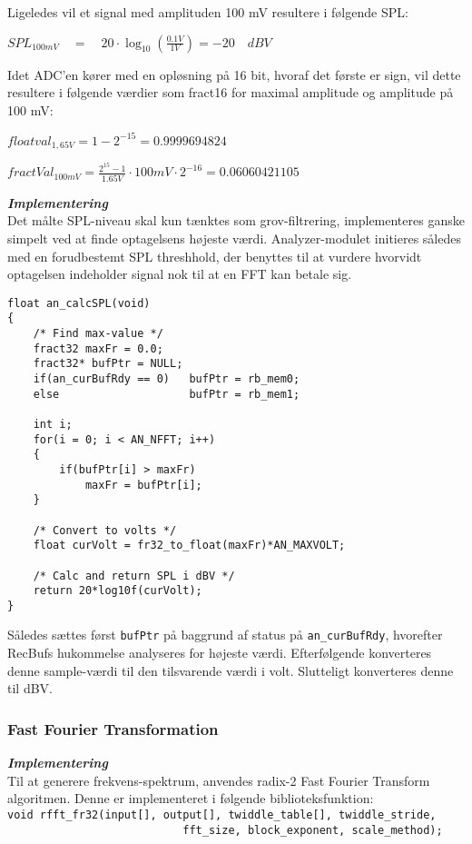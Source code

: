 Ligeledes vil et signal med amplituden 100 mV resultere i følgende SPL:
\begin{center}
${ SPL }_{ 100mV }\quad =\quad 20\cdot \log _{ 10 }{ \left( \frac { 0.1V }{ 1V }  \right)  } =-20\quad dBV$
\end{center}

Idet ADC'en kører med en opløsning på 16 bit, hvoraf det første er sign, vil dette resultere i følgende værdier som fract16 for maximal amplitude og amplitude på 100 mV:
\begin{center}
${ floatval }_{ 1,65V }=1-{ 2 }^{ -15 }=0.9999694824$ 
\end{center}
\begin{center}
$fractVal_{ 100mV }=\frac { { 2 }^{ 15 }-1 }{ 1.65V } \cdot 100mV\cdot { 2 }^{ -16 }=0.06060421105$
\end{center}

\textbf{\textit{Implementering}} \\
Det målte SPL-niveau skal kun tænktes som grov-filtrering, implementeres ganske simpelt ved at finde optagelsens højeste værdi. Analyzer-modulet initieres således med en forudbestemt SPL threshhold, der benyttes til at vurdere hvorvidt optagelsen indeholder signal nok til at en FFT kan betale sig.
\begin{verbatim}
float an_calcSPL(void)
{
    /* Find max-value */
    fract32 maxFr = 0.0;
    fract32* bufPtr = NULL;
    if(an_curBufRdy == 0)   bufPtr = rb_mem0;
    else                    bufPtr = rb_mem1;
	
    int i;
    for(i = 0; i < AN_NFFT; i++)
    {
        if(bufPtr[i] > maxFr)
            maxFr = bufPtr[i];
    }
    
    /* Convert to volts */
    float curVolt = fr32_to_float(maxFr)*AN_MAXVOLT;
	
    /* Calc and return SPL i dBV */
    return 20*log10f(curVolt);
}
\end{verbatim}
Således sættes først \verb+bufPtr+ på baggrund af status på \verb+an_curBufRdy+, hvorefter RecBufs hukommelse analyseres for højeste værdi. Efterfølgende konverteres denne sample-værdi til den tilsvarende værdi i volt. Slutteligt konverteres denne til dBV.

\subsubsection{Fast Fourier Transformation}
\textbf{\textit{Implementering}} \\
Til at generere frekvens-spektrum, anvendes radix-2 Fast Fourier Transform algoritmen. Denne er implementeret i følgende biblioteksfunktion: \\
\verb+void rfft_fr32(input[], output[], twiddle_table[], twiddle_stride, + \\
\verb+                           fft_size, block_exponent, scale_method);+


